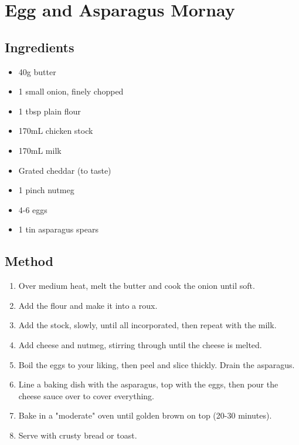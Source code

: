 \clearpage
\section{Egg and Asparagus Mornay}

\subsection{Ingredients}

\begin{itemize}
	\item 40g butter
	\item 1 small onion, finely chopped
	\item 1 tbsp plain flour
	\item 170mL chicken stock
	\item 170mL milk
	\item Grated cheddar (to taste)
	\item 1 pinch nutmeg
	\item 4-6 eggs
	\item 1 tin asparagus spears
\end{itemize}

\subsection{Method}

\begin{enumerate}
	\item Over medium heat, melt the butter and cook the onion until soft.
	\item Add the flour and make it into a roux.
	\item Add the stock, slowly, until all incorporated, then repeat with the milk.
	\item Add cheese and nutmeg, stirring through until the cheese is melted.
	\item Boil the eggs to your liking, then peel and slice thickly. Drain the asparagus.
	\item Line a baking dish with the asparagus, top with the eggs, then pour the cheese sauce over to cover everything.
	\item Bake in a "moderate" oven until golden brown on top (20-30 minutes).
	\item Serve with crusty bread or toast.
\end{enumerate}
